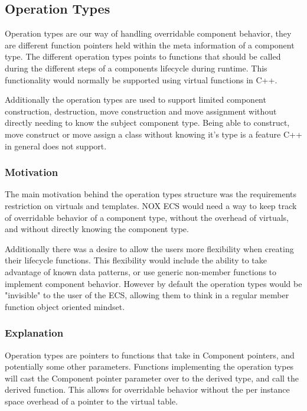 \subsection{Operation Types}
\label{subsec:detailed_operation_types}
Operation types are our way of handling overridable component behavior,
they are different function pointers held within the meta information of a component type.
The different operation types points to functions that should be called during the different steps
of a components lifecycle during runtime.
This functionality would normally be supported using virtual functions in C++.

Additionally the operation types are used to support limited component construction, destruction,
move construction and move assignment without directly needing to know the subject component type.
Being able to construct, move construct or move assign a class without knowing it's type is a feature
C++ in general does not support. 

\subsubsection{Motivation}
The main motivation behind the operation types structure was the requirements restriction on virtuals
and templates.
NOX ECS would need a way to keep track of overridable behavior of a component type, without the overhead of virtuals,
and without directly knowing the component type.

Additionally there was a desire to allow the users more flexibility when creating their lifecycle functions.
This flexibility would include the ability to take advantage of known data patterns,
or use generic non-member functions to implement component behavior.
However by default the operation types would be "invisible" to the user of the ECS,
allowing them to think in a regular member function object oriented mindset.

\subsubsection{Explanation}
Operation types are pointers to functions that take in Component pointers,
and potentially some other parameters.
Functions implementing the operation types will cast the Component pointer parameter over to the derived type,
and call the derived function.
This allows for overridable behavior without the per instance space overhead of a pointer to the virtual table.

